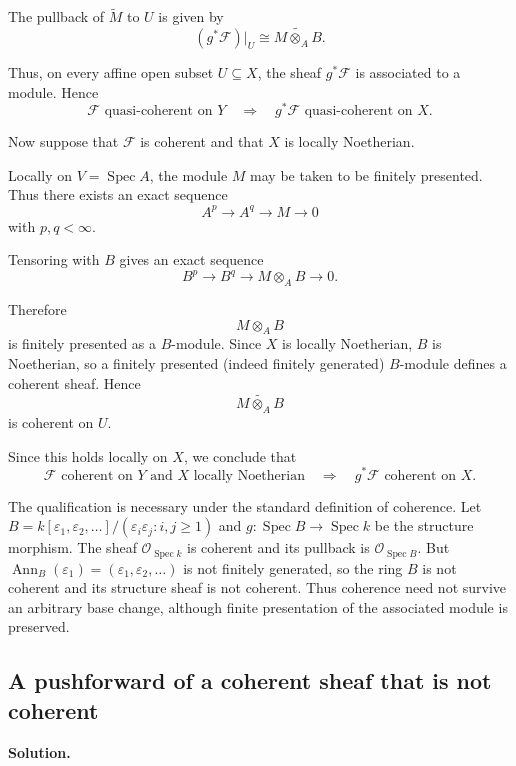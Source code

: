 The pullback of \(\widetilde{M}\) to \(U\) is given by
\[
(g^*\mathcal{F})|_U
\cong
\widetilde{M\otimes_A B}.
\]

Thus, on every affine open subset \(U\subseteq X\), the sheaf \(g^*\mathcal{F}\) is associated to a module. Hence
\[
\boxed{
	\mathcal{F}\text{ quasi-coherent on }Y
	\quad\Longrightarrow\quad
	g^*\mathcal{F}\text{ quasi-coherent on }X.
}
\]

Now suppose that \(\mathcal{F}\) is coherent and that $X$ is locally Noetherian.

Locally on \(V=\operatorname{Spec} A\), the module \(M\) may be taken to be finitely presented. Thus there exists an exact sequence
\[
A^p\longrightarrow A^q\longrightarrow M\longrightarrow 0
\]
with \(p,q<\infty\).

Tensoring with \(B\) gives an exact sequence
\[
B^p\longrightarrow B^q\longrightarrow M\otimes_A B\longrightarrow 0.
\]

Therefore
\[
M\otimes_A B
\]
is finitely presented as a \(B\)-module. Since $X$ is locally Noetherian,
$B$ is Noetherian, so a finitely presented (indeed finitely generated)
$B$-module defines a coherent sheaf. Hence
\[
\widetilde{M\otimes_A B}
\]
is coherent on \(U\).

Since this holds locally on \(X\), we conclude that
\[
\boxed{
	\mathcal{F}\text{ coherent on }Y\text{ and }X\text{ locally Noetherian}
	\quad\Longrightarrow\quad
	g^*\mathcal{F}\text{ coherent on }X.
}
\]

The qualification is necessary under the standard definition of coherence.
Let $B=k[\varepsilon_1,\varepsilon_2,\ldots]/
(\varepsilon_i\varepsilon_j:i,j\geq1)$ and
$g:\operatorname{Spec}B\to\operatorname{Spec}k$ be the structure morphism.
The sheaf $\mathcal O_{\operatorname{Spec}k}$ is coherent and its
pullback is $\mathcal O_{\operatorname{Spec}B}$. But
$\operatorname{Ann}_B(\varepsilon_1)=(\varepsilon_1,\varepsilon_2,\ldots)$
is not finitely generated, so the ring $B$ is not coherent and its
structure sheaf is not coherent. Thus coherence need not survive an
arbitrary base change, although finite presentation of the associated
module is preserved.

\subsection{A pushforward of a coherent sheaf that is not coherent}

\textbf{Solution.}

